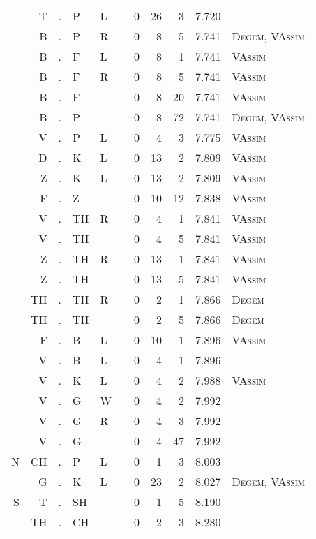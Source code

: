 \begin{longtable}{r@{ } r@{ } c@{ } l@{ } l@{ } l@{ } r r r r l }
  & T & . & P & L &   & 0 & 26 & 3 & 7.720 &  \\
  & B & . & P & R &   & 0 & 8 & 5 & 7.741 & \textsc{Degem}, \textsc{VAssim} \\
  & B & . & F & L &   & 0 & 8 & 1 & 7.741 & \textsc{VAssim} \\
  & B & . & F & R &   & 0 & 8 & 5 & 7.741 & \textsc{VAssim} \\
  & B & . & F &   &   & 0 & 8 & 20 & 7.741 & \textsc{VAssim} \\
  & B & . & P &   &   & 0 & 8 & 72 & 7.741 & \textsc{Degem}, \textsc{VAssim} \\
  & V & . & P & L &   & 0 & 4 & 3 & 7.775 & \textsc{VAssim} \\
  & D & . & K & L &   & 0 & 13 & 2 & 7.809 & \textsc{VAssim} \\
  & Z & . & K & L &   & 0 & 13 & 2 & 7.809 & \textsc{VAssim} \\
  & F & . & Z &   &   & 0 & 10 & 12 & 7.838 & \textsc{VAssim} \\
  & V & . & TH & R &   & 0 & 4 & 1 & 7.841 & \textsc{VAssim} \\
  & V & . & TH &   &   & 0 & 4 & 5 & 7.841 & \textsc{VAssim} \\
  & Z & . & TH & R &   & 0 & 13 & 1 & 7.841 & \textsc{VAssim} \\
  & Z & . & TH &   &   & 0 & 13 & 5 & 7.841 & \textsc{VAssim} \\
  & TH & . & TH & R &   & 0 & 2 & 1 & 7.866 & \textsc{Degem} \\
  & TH & . & TH &   &   & 0 & 2 & 5 & 7.866 & \textsc{Degem} \\
  & F & . & B & L &   & 0 & 10 & 1 & 7.896 & \textsc{VAssim} \\
  & V & . & B & L &   & 0 & 4 & 1 & 7.896 &  \\
  & V & . & K & L &   & 0 & 4 & 2 & 7.988 & \textsc{VAssim} \\
  & V & . & G & W &   & 0 & 4 & 2 & 7.992 &  \\
  & V & . & G & R &   & 0 & 4 & 3 & 7.992 &  \\
  & V & . & G &   &   & 0 & 4 & 47 & 7.992 &  \\
N & CH & . & P & L &   & 0 & 1 & 3 & 8.003 &  \\
  & G & . & K & L &   & 0 & 23 & 2 & 8.027 & \textsc{Degem}, \textsc{VAssim} \\
S & T & . & SH &   &   & 0 & 1 & 5 & 8.190 &  \\
  & TH & . & CH &   &   & 0 & 2 & 3 & 8.280 &  \\

\end{longtable}
